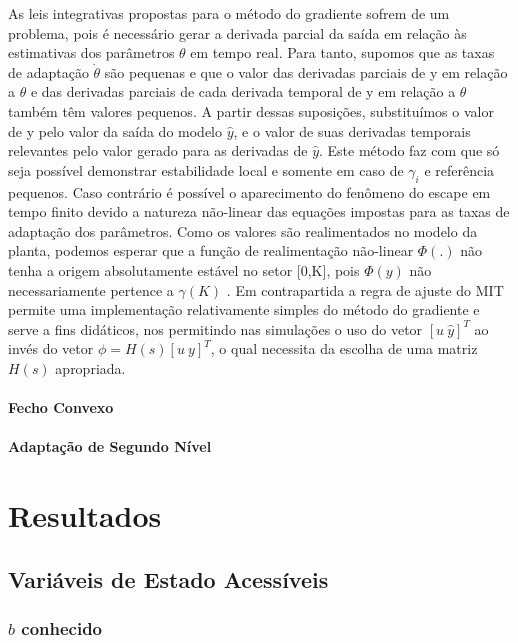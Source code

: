 \documentclass[
	12pt,				%
	openright,			%
	twoside,			%
	a4paper,			%
	english,			%
	french,				%
	spanish,			%
	brazil				%
	]{abntex2}
\begin{document}
 As leis integrativas propostas para o método do gradiente sofrem de um problema, pois é necessário gerar a derivada parcial da saída em relação às estimativas dos parâmetros $\theta$ em tempo real. Para tanto, supomos que as taxas de adaptação $\dot{\theta}$ são pequenas e que o valor das derivadas parciais de y em relação a $\theta$ e das derivadas parciais de cada derivada temporal de y em relação a $\theta$ também têm valores pequenos. A partir dessas suposições, substituímos o valor de y pelo valor da saída do modelo $\hat{y}$, e o valor de suas derivadas temporais relevantes pelo valor gerado para as derivadas de $\hat{y}$. Este método faz com que só seja possível demonstrar estabilidade local e somente em caso de $\gamma_i$ e referência pequenos. Caso contrário é possível o aparecimento do fenômeno do escape em tempo finito devido a natureza não-linear das equações impostas para as taxas de adaptação dos parâmetros. Como os valores são realimentados no modelo da planta, podemos esperar que a função de realimentação não-linear $\Phi(.)$ não tenha a origem absolutamente estável no setor [0,K], pois $\Phi(y)$ não necessariamente pertence a $\gamma(K)$  \cite{khalil}. Em contrapartida a regra de ajuste do MIT permite uma implementação relativamente simples do método do gradiente e serve a fins didáticos, nos permitindo nas simulações o uso do vetor $[u~\hat{y}]^T$ ao invés do vetor $\phi=H(s)[u~y]^T$, o qual necessita da escolha de uma matriz $H(s)$ apropriada. 
 

\subsection{Fecho Convexo}
\subsection{Adaptação de Segundo Nível}

\part{Resultados}

\chapter{Variáveis de Estado Acessíveis}
\section{$b$ conhecido}
\end{document}
